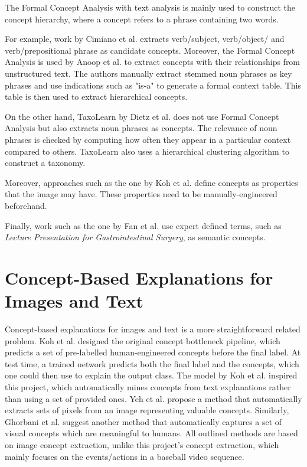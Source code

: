 The Formal Concept Analysis with text analysis is mainly used to construct the concept hierarchy, where a concept refers to a phrase containing two words.

For example, work by Cimiano et al. \cite{RefWorks:RefID:32-cimiano2005learning} extracts verb/subject, verb/object/ and verb/prepositional phrase as candidate concepts.
Moreover, the Formal Concept Analysis is used by Anoop et al. \cite{RefWorks:RefID:33-anoop2019extracting} to extract concepts with their relationships from unstructured text.
The authors manually extract stemmed noun phrases as key phrases and use indications such as "is-a" to generate a formal context table.
This table is then used to extract hierarchical concepts.

On the other hand, TaxoLearn \cite{RefWorks:RefID:34-dietz2012taxolearn} by Dietz et al. does not use Formal Concept Analysis but also extracts noun phrases as concepts. The relevance of noun phrases is checked by computing how often they appear in a particular context compared to others. TaxoLearn also uses a hierarchical clustering algorithm to construct a taxonomy.

Moreover, approaches such as the one by Koh et al. \cite{RefWorks:RefID:35-koh2020concept} define concepts as properties that the image may have. These properties need to be manually-engineered beforehand.

Finally, work such as the one by Fan et al. \cite{RefWorks:RefID:50-fan2004semantic} use expert defined terms, such as \emph{Lecture Presentation for Gastrointestinal Surgery}, as semantic concepts. 


\section{Concept-Based Explanations for Images and Text}

Concept-based explanations for images and text is a more straightforward related problem.
Koh et al. \cite{RefWorks:RefID:35-koh2020concept} designed the original concept bottleneck pipeline, which predicts a set of pre-labelled human-engineered concepts before the final label.
At test time, a trained network predicts both the final label and the concepts, which one could then use to explain the output class.
The model by Koh et al. inspired this project, which automatically mines concepts from text explanations rather than using a set of provided ones.
Yeh et al. \cite{RefWorks:RefID:36-yeh2019completeness-aware} propose a method that automatically extracts sets of pixels from an image representing valuable concepts.
Similarly, Ghorbani et al. \cite{RefWorks:RefID:37-ghorbani2019automatic} suggest another method that automatically captures a set of visual concepts which are meaningful to humans.
All outlined methods are based on image concept extraction, unlike this project's concept extraction, which mainly focuses on the events/actions in a baseball video sequence.


